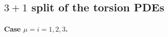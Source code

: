 \documentclass[
10pt, %
a4paper, %
oneside, %
twocolumn,
headinclude,footinclude, %
BCOR5mm, %
]{scrartcl}
\newcommand{\IP}[1]{{\color{Red}[IP:\ \ #1]}}
\newcommand{\Dm}[2]{D_{\phantom{#2}#1}^{#2}}	%
\newcommand{\aD}[2]{\mathcal{D}_{\phantom{#2}#1}^{#2}}	%
\newcommand{\Bm}[2]{B^{#1#2}}	%
\newcommand{\aB}[2]{\mathcal{B}^{#1#2}}	%
\newcommand{\Um}{U}%
\newcommand{\LCsymb}{\bm{\in}}    %
\begin{document}
	
	
	\subsection{$ 3+1 $ split of the torsion PDEs}	\label{ssec.31.tors}
	
	
	\paragraph{Case $ \mu = i=1,2,3 $.} 
	
\end{document}

